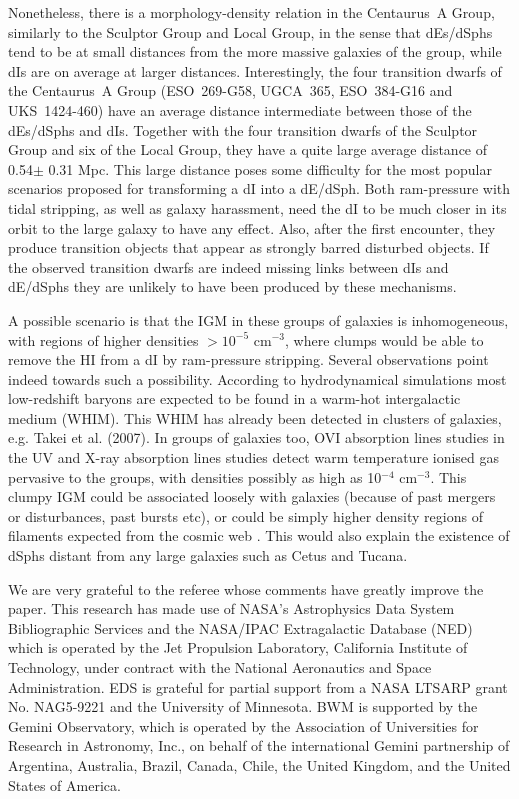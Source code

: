 \documentclass[preprint]{aastex}
\begin{document}
Nonetheless, there is a morphology-density relation in the Centaurus~A Group, 
similarly to the Sculptor Group and Local Group, in the sense that
dEs/dSphs tend to be at small distances from the more massive galaxies
of the group, while dIs are on average at larger distances. Interestingly,
the four transition dwarfs of the Centaurus~A Group (ESO~269-G58, UGCA~365,
ESO~384-G16 and UKS~1424-460) have an average distance intermediate between those
of the dEs/dSphs and dIs. Together with the four transition dwarfs of 
the Sculptor Group and six of the Local Group, they have a quite large
average distance of 0.54$\pm$ 0.31 Mpc. This large distance poses some
difficulty for the most popular scenarios proposed for transforming a dI
into a dE/dSph. Both ram-pressure with tidal stripping, as well as galaxy
harassment, need the dI to be much closer in its orbit to the large galaxy to have
any effect. Also, after the first encounter, they produce transition
objects that appear as strongly barred disturbed objects. If the observed
transition dwarfs are indeed missing links between dIs and dE/dSphs
they are unlikely to have been produced by these mechanisms.

A possible scenario is that the IGM in these groups of galaxies is inhomogeneous,
with regions of higher densities $> 10^{-5}$ cm$^{-3}$, where clumps would be
able to remove the HI from a dI by ram-pressure stripping. 
Several observations point indeed towards such a possibility. According to hydrodynamical 
simulations most low-redshift baryons are expected to be found in a warm-hot 
intergalactic medium (WHIM). This WHIM has already been detected in clusters 
of galaxies, e.g. Takei et al. (2007). In groups of galaxies too,   
OVI absorption
lines studies in the UV \citep{sem03} and X-ray absorption lines studies \citep{ni02}
detect warm temperature ionised gas pervasive to the groups, with
densities possibly as high as 10$^{-4}$ cm$^{-3}$.
This clumpy IGM could be
associated loosely with galaxies (because of past mergers or disturbances,
past bursts etc), or could be simply higher density regions of filaments expected
from the cosmic web \citep{dave2001}. This would also explain the 
existence of dSphs distant from any large galaxies such as Cetus and Tucana.

\acknowledgments

We are very grateful to the referee whose comments have greatly improve
the paper. 
This research has made use of NASA's Astrophysics Data System
Bibliographic Services and the NASA/IPAC Extragalactic Database (NED)
which is operated by the Jet Propulsion Laboratory, California Institute
of Technology, under contract with the National Aeronautics and Space
Administration. 
EDS is grateful for partial support from a NASA LTSARP grant No. NAG5-9221
and the University of Minnesota.
BWM is supported by the Gemini Observatory, which is operated by the 
Association of Universities for Research in Astronomy, Inc., on behalf 
of the international Gemini partnership of Argentina, Australia, Brazil, 
Canada, Chile, the United Kingdom, and the United States of America. 
\end{document}
